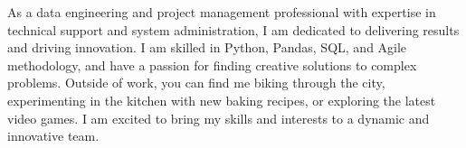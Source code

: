 

\begin{cvparagraph}

As a data engineering and project management professional with expertise in technical support and system administration, I am dedicated to delivering results and driving innovation. I am skilled in Python, Pandas, SQL, and Agile methodology, and have a passion for finding creative solutions to complex problems. Outside of work, you can find me biking through the city, experimenting in the kitchen with new baking recipes, or exploring the latest video games. I am excited to bring my skills and interests to a dynamic and innovative team.
\end{cvparagraph}
